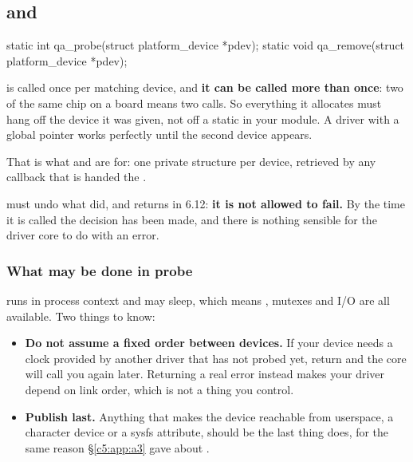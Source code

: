 \subsection{ and }
\label{c10:app:a3}

\begin{ccode}
static int qa_probe(struct platform_device *pdev);
static void qa_remove(struct platform_device *pdev);
\end{ccode}

\noindent {} is called once per matching device, and \textbf{it can be called more than
once}: two of the same chip on a board means two calls. So everything it allocates must hang off the
device it was given, not off a static in your module. A driver with a global  pointer
works perfectly until the second device appears.

That is what  and  are for: one private structure
per device, retrieved by any callback that is handed the .

 must undo what  did, and returns  in 6.12: \textbf{it is not
allowed to fail.} By the time it is called the decision has been made, and there is nothing sensible
for the driver core to do with an error.

\subsubsection{What may be done in probe}
\label{c10:app:a:what-may-be-done-in-probe}

 runs in process context and may sleep, which means , mutexes and I/O
are all available. Two things to know:
\begin{itemize}
  \item \textbf{Do not assume a fixed order between devices.} If your device needs a clock provided
    by another driver that has not probed yet, return  and the core will call
    you again later. Returning a real error instead makes your driver depend on link order, which is
    not a thing you control.
  \item \textbf{Publish last.} Anything that makes the device reachable from userspace, a character
    device or a sysfs attribute, should be the last thing  does, for the same reason
    \S\ref{c5:app:a3} gave about .
\end{itemize}

